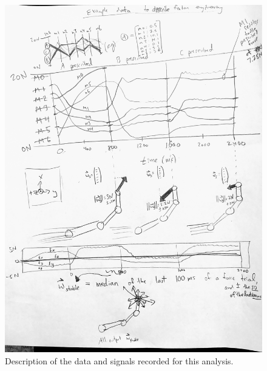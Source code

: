 \documentclass[utf8]{frontiersSCNS} %
\begin{document}
\begin{figure}[h!]
\begin{center}
\includegraphics[width=15cm]{figures/data_description/data_description.jpg}%
\end{center}
\caption{Description of the data and signals recorded for this analysis. }
\label{fig:data_description}
\end{figure}
\end{document}
